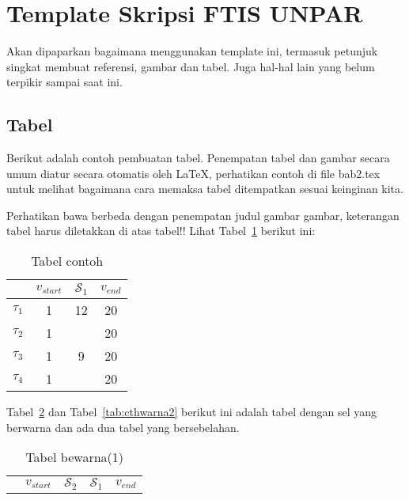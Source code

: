 {


\section{Template Skripsi FTIS UNPAR}
\label{sec:template}
 
Akan dipaparkan bagaimana menggunakan template ini, termasuk petunjuk singkat membuat referensi, gambar dan tabel.
Juga hal-hal lain yang belum terpikir sampai saat ini. 
 

\subsection{Tabel}  
Berikut adalah contoh pembuatan tabel. 
Penempatan tabel dan gambar secara umum diatur secara otomatis oleh \LaTeX{}, perhatikan contoh di file bab2.tex untuk melihat bagaimana cara memaksa tabel ditempatkan sesuai keinginan kita.

Perhatikan bawa berbeda dengan penempatan judul gambar gambar, keterangan tabel harus diletakkan di atas tabel!!
Lihat Tabel~\ref{tab:contoh1} berikut ini:

\begin{table}[H] %
	\centering 
	\caption{Tabel contoh}
	\label{tab:contoh1}
	\begin{tabular}{cccc}
		\toprule
		& $v_{start}$ & $\mathcal{S}_{1}$ & $v_{end}$\\

		\midrule
		$\tau_{1}$ & 1 & 12& 20\\
		$\tau_{2}$ & 1 &  & 20\\
		$\tau_{3}$ & 1 & 9 & 20\\
		$\tau_{4}$ & 1 &  & 20\\

		\bottomrule
		
	\end{tabular} 
\end{table}
Tabel~\ref{tab:cthwarna1} dan Tabel~\ref{tab:cthwarna2} berikut ini adalah tabel dengan sel yang berwarna dan ada dua tabel yang bersebelahan. 
\begin{table}[H]
	\begin{minipage}[c]{0.49\linewidth}
		\centering
		\caption{Tabel bewarna(1)}
		\label{tab:cthwarna1}
		\begin{tabular}{ccccc}
			\toprule
			 & $v_{start}$ & $\mathcal{S}_{2}$ & $\mathcal{S}_{1}$ & $v_{end}$\\
			

\end{tabular}
\end{minipage}
\end{table}}

